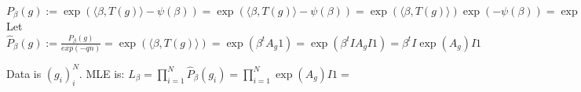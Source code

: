 \documentclass{article}
\theoremstyle{definition}
\begin{document}
\( P_\beta(g) := \exp( \langle \beta, T(g) \rangle - \psi(\beta) ) 
= \exp( \langle \beta, T(g) \rangle - \psi(\beta) ) 
= \exp( \langle \beta, T(g) \rangle) \exp( - \psi(\beta) ) 
= \exp( \langle \beta, T(g) \rangle) \exp( - qn ) 
\)
Let $\hat{P}_\beta(g) := \frac{P_\beta(g)}{exp(-qn)} = \exp( \langle \beta, T(g) \rangle) = \exp(\beta^t A_g 1) = \exp(\beta^t I A_g I 1) = \beta^t I \exp(A_g ) I 1  $

Data is $(g_i)_i^N$.
MLE is: $L_\beta = \prod_{i=1}^N \hat{P}_\beta(g_i) = \prod_{i=1}^N\exp(A_g ) I 1 = $
\end{document}
